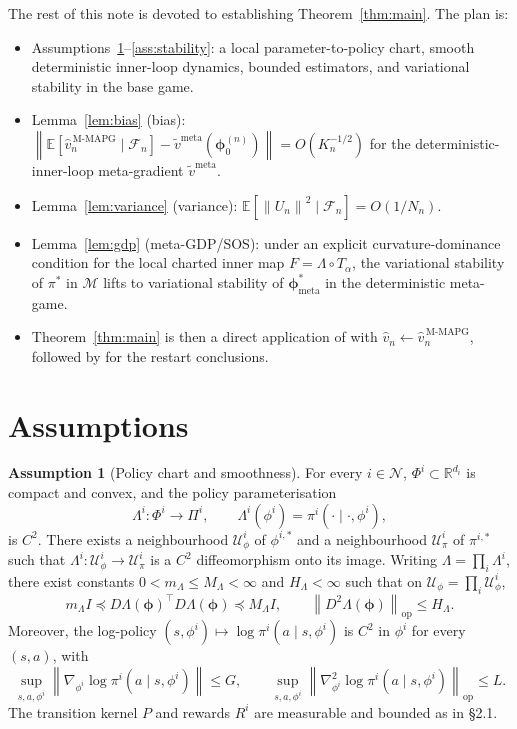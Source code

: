 \documentclass[11pt]{article}
\theoremstyle{definition}
\newtheorem{assumption}{Assumption}
\newcommand{\R}{\mathbb{R}}
\newcommand{\E}{\mathbb{E}}
\newcommand{\norm}[1]{\left\lVert #1 \right\rVert}
\newcommand{\calF}{\mathcal{F}}
\newcommand{\calN}{\mathcal{N}}
\newcommand{\calM}{\mathcal{M}}
\newcommand{\calU}{\mathcal{U}}
\newcommand{\meta}{\mathrm{meta}}
\newcommand{\MAPG}{\mathrm{M\text{-}MAPG}}
\begin{document}
The rest of this note is devoted to establishing Theorem~\ref{thm:main}. The plan is:
\begin{itemize}
\item Assumptions~\ref{ass:chart}--\ref{ass:stability}: a local parameter-to-policy chart, smooth deterministic inner-loop dynamics, bounded estimators, and variational stability in the base game.
\item Lemma~\ref{lem:bias} (bias): $\norm{\E[\hat v_n^{\,\MAPG}\mid\calF_n]-\widetilde v^\meta(\bm\phi_0^{(n)})}=O(K_n^{-1/2})$ for the deterministic-inner-loop meta-gradient $\widetilde v^\meta$.
\item Lemma~\ref{lem:variance} (variance): $\E[\norm{U_n}^2\mid\calF_n]=O(1/N_n)$.
\item Lemma~\ref{lem:gdp} (meta-GDP/SOS): under an explicit curvature-dominance condition for the local charted inner map $F=\Lambda\circ T_\alpha$, the variational stability of $\pi^*$ in $\calM$ lifts to variational stability of $\bm\phi^*_{\meta}$ in the deterministic meta-game.
\item Theorem~\ref{thm:main} is then a direct application of \cite[Theorem~1]{Giannou2022} with $\hat v_n\leftarrow\hat v_n^{\,\MAPG}$, followed by \cite[§4]{Giannou2022} for the restart conclusions.
\end{itemize}

\section{Assumptions}

\begin{assumption}[Policy chart and smoothness]\label{ass:chart}
For every $i\in\calN$, $\Phi^i\subset\R^{d_i}$ is compact and convex, and the policy parameterisation
\[
\Lambda^i:\Phi^i\to\Pi^i,\qquad
\Lambda^i(\phi^i)=\pi^i(\cdot\mid\cdot,\phi^i),
\]
is $C^2$. There exists a neighbourhood $\calU_\phi^i$ of $\phi^{i,*}$ and a neighbourhood $\calU_\pi^i$ of $\pi^{i,*}$ such that $\Lambda^i:\calU_\phi^i\to\calU_\pi^i$ is a $C^2$ diffeomorphism onto its image. Writing $\Lambda=\prod_i\Lambda^i$, there exist constants $0<m_\Lambda\le M_\Lambda<\infty$ and $H_\Lambda<\infty$ such that on $\calU_\phi=\prod_i\calU_\phi^i$,
\begin{equation*}
m_\Lambda I \preceq D\Lambda(\bm\phi)^\top D\Lambda(\bm\phi)\preceq M_\Lambda I,\qquad
\norm{D^2\Lambda(\bm\phi)}_{\mathrm{op}}\le H_\Lambda.
\end{equation*}
Moreover, the log-policy $(s,\phi^i)\mapsto\log\pi^i(a\mid s,\phi^i)$ is $C^2$ in $\phi^i$ for every $(s,a)$, with
\begin{equation*}
\sup_{s,a,\phi^i}\norm{\nabla_{\phi^i}\log\pi^i(a\mid s,\phi^i)}\le G,\qquad
\sup_{s,a,\phi^i}\norm{\nabla^2_{\phi^i}\log\pi^i(a\mid s,\phi^i)}_{\mathrm{op}}\le L.
\end{equation*}
The transition kernel $P$ and rewards $R^i$ are measurable and bounded as in §2.1.
\end{assumption}
\end{document}
